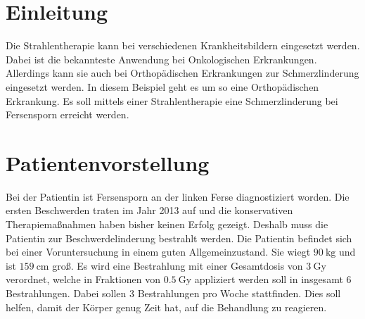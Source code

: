 \section{Einleitung}
\label{sec:Einleitung}

Die Strahlentherapie kann bei verschiedenen Krankheitsbildern eingesetzt werden.
Dabei ist die bekannteste Anwendung bei Onkologischen Erkrankungen. Allerdings
kann sie auch bei Orthopädischen Erkrankungen zur Schmerzlinderung eingesetzt werden.
In diesem Beispiel geht es um so eine Orthopädischen Erkrankung.
Es soll mittels einer Strahlentherapie eine Schmerzlinderung bei Fersensporn erreicht werden.

\section{Patientenvorstellung}

Bei der Patientin ist Fersensporn an der linken Ferse diagnostiziert worden.
Die ersten Beschwerden traten im Jahr 2013 auf
und die konservativen Therapiemaßnahmen haben bisher keinen Erfolg gezeigt. Deshalb muss die Patientin zur Beschwerdelinderung
bestrahlt werden. Die Patientin befindet sich bei einer Voruntersuchung in einem guten Allgemeinzustand.
Sie wiegt $\SI{90}{\kilo\gram}$ und ist $\SI{159}{\centi\meter}$ groß.
Es wird eine Bestrahlung mit einer Gesamtdosis von $\SI{3}{\gray}$ verordnet, welche in Fraktionen von
$\SI{0.5}{\gray}$ appliziert werden soll in insgesamt 6 Bestrahlungen.
Dabei sollen 3 Bestrahlungen pro Woche stattfinden.
Dies soll helfen, damit der Körper genug Zeit hat, auf die Behandlung zu reagieren.
